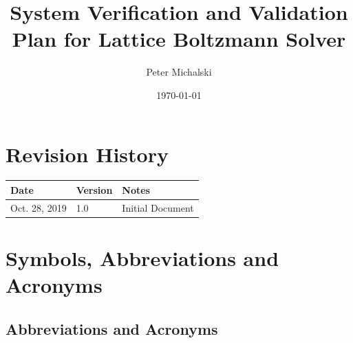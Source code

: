 \documentclass[12pt, titlepage]{article}
\newcommand{\famname}{Lattice Boltzmann Solver}
\begin{document}
\title{System Verification and Validation Plan for \famname} 
\author{Peter Michalski}
\date{\today}
	
\maketitle


\section{Revision History}

\begin{tabularx}{\textwidth}{p{4cm}p{2cm}X}
\toprule {\bf Date} & {\bf Version} & {\bf Notes}\\
\midrule
Oct. 28, 2019 & 1.0 & Initial Document\\
\bottomrule
\end{tabularx}

\newpage

\tableofcontents

\newpage

\listoftables

\listoffigures

\newpage

\section{Symbols, Abbreviations and Acronyms}

\subsection{Abbreviations and Acronyms}
\end{document}
